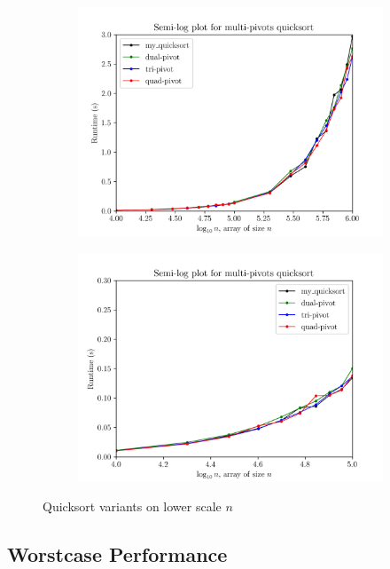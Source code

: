 \documentclass[titlepage, 12pt]{article}
\begin{document}
\begin{figure}[h]
  \centering
  \begin{subfigure}{0.5\textwidth}
    \centering
    \includegraphics[width=\linewidth]{multp-zoomed-1} 
  \end{subfigure}%
  \begin{subfigure}{0.5\textwidth}
    \centering
    \includegraphics[width=\linewidth]{multp-zoomed-2} 
  \end{subfigure}
  \caption{Quicksort variants on lower scale \( n \)}
  \label{fig:multp-zoomed}
\end{figure}

\subsection{Worstcase Performance}
\label{sec:worst}
\end{document}
